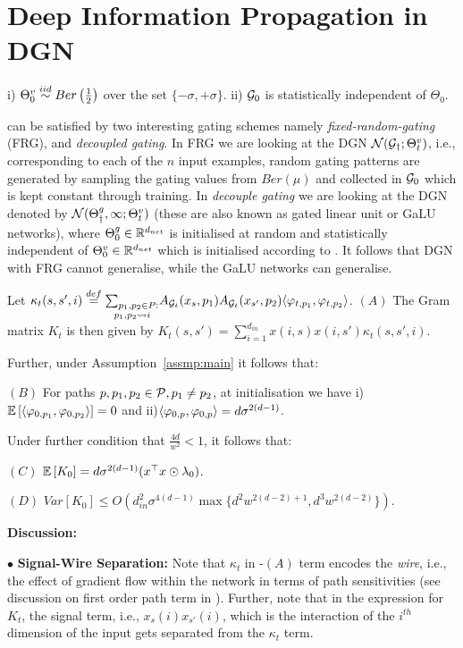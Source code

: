 \section{Deep Information Propagation in DGN}\label{sec:optimisation}

\begin{assumption}\label{assmp:main}
i) $\Tv_0\stackrel{iid}\sim Ber\left(\frac{1}{2}\right)$ over the set $\{-\sigma,+\sigma\}$. ii) $\G_0$ is statistically independent of $\Theta_0$.
\end{assumption}
  can be satisfied by two interesting gating schemes namely \emph{fixed-random-gating} (FRG), and \emph{decoupled gating}. In FRG we are looking at the DGN $\N(\G_{\dagger};\Tv_t)$, i.e., corresponding to each of the $n$ input examples, random gating patterns are generated by sampling the gating values from $Ber(\mu)$ and collected in $\G_0$ which is kept constant through training. In \emph{decouple gating} we are looking at the DGN denoted by $\N(\Tg_\dagger, \infty;\Tv_t)$ (these are also known as gated linear unit or GaLU networks), where $\Tg_0\in \R^{d_{net}}$ is initialised at random and statistically independent of $\Tv_0\in \R^{d_{net}}$ which is initialised according to . It follows that DGN with FRG cannot generalise, while the GaLU networks can generalise. 
 
\begin{theorem}[DIP]\label{th:opti} Let $\kappa_t(s,s',i)\stackrel{def}=\underset{p_1,p_2\rsa i}{\sum_{p_1,p_2\in P:}} A_{\G_t}(x_s,p_1) A_{\G_t}(x_{s'},p_2) \ip{\varphi_{t,p_1}, \varphi_{t,p_2}}$. 
$(A)$ The Gram matrix $K_t$ is then given by ${K_t(s,s')}=\sum_{i=1}^{d_{in}} x(i,s)x(i,s') \kappa_t(s,s',i)$. 

Further, under Assumption~\ref{assmp:main} it follows that:

$(B)$ For paths $p,p_1,p_2\in \P, p_1\neq p_2$, at initialisation we have  i) $\E{\ip{\varphi_{0,p_1}, \varphi_{0,p_2}}}= 0$ and ii)${\ip{\varphi_{0,p}, \varphi_{0,p}}}= d\sigma^{2(d-1)}$.

Under further condition that $\frac{4d}{w^2}<1$, it follows that:

$(C)$ $\E{K_0}=d\sigma^{2(d-1)}(x^\top x \odot \lambda_0)$.

$(D)$ $Var\left[K_0\right]\leq O\left(d^2_{in}\sigma^{4(d-1)}\max\{d^2w^{2(d-2)+1}, d^3w^{2(d-2)}\}\right)$.
\end{theorem}
\textbf{Discussion:}

$\bullet$  \textbf{Signal-Wire Separation:} Note that $\kappa_t$ in -$(A)$ term encodes the \emph{wire}, i.e., the effect of gradient flow within the network in terms of path sensitivities (see discussion on first order path term in ). Further, note that in the expression for $K_t$, the signal term, i.e., $x_s(i)x_{s'}(i)$, which is the interaction of the $i^{th}$ dimension of the input gets separated from the $\kappa_t$ term.

